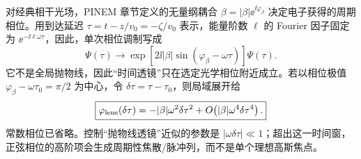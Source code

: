 对经典相干光场，PINEM 章节定义的无量纲耦合 $\beta=|\beta|\ee^{\ii\varphi_\beta}$ 决定电子获得的周期相位。用到达延迟 $\tau=t-z/v_0=-\zeta/v_0$ 表示，能量阶数 $\ell$ 的 Fourier 因子固定为 $\ee^{-\ii\ell\omega\tau}$，因此，单次相位调制写成
\begin{equation}
\boxed{
\Psi(\tau)\longrightarrow
\exp\!\left[2\ii|\beta|\sin(\varphi_\beta-\omega\tau)\right]\Psi(\tau).}
\label{eq:electron_periodic_time_phase}
\end{equation}
它不是全局抛物线，因此“时间透镜”只在选定光学相位附近成立。若以相位极值 $\varphi_\beta-\omega\tau_0=\pi/2$ 为中心，令 $\delta\tau=\tau-\tau_0$，则局域展开给
\begin{equation}
\boxed{
\varphi_{\rm lens}(\delta\tau)
=-|\beta|\omega^2\delta\tau^2
+O\!\left(|\beta|\omega^4\delta\tau^4\right).}
\label{eq:electron_local_time_lens_phase}
\end{equation}
常数相位已省略。控制“抛物线透镜”近似的参数是 $|\omega\delta\tau|\ll1$；超出这一时间窗，正弦相位的高阶项会生成周期性焦散/脉冲列，而不是单个理想高斯焦点。


